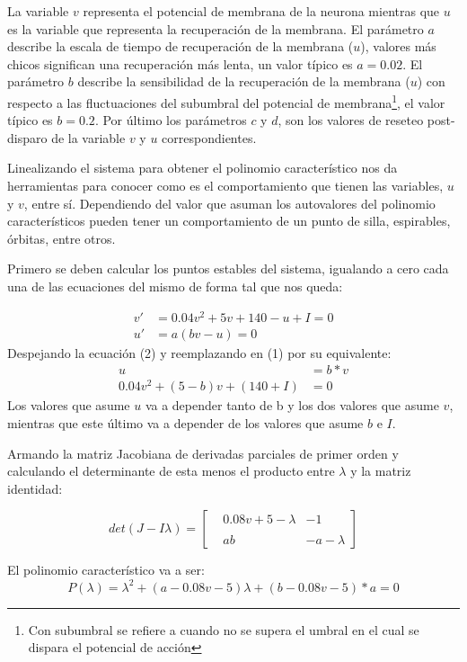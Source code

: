\documentclass[12pt,a4paper]{article}
\begin{document}
La variable $v$ representa el potencial de membrana de la neurona mientras que $u$ es la variable que representa la recuperación de la membrana. El parámetro $a$ describe la escala de tiempo de recuperación de la membrana ($u$), valores más chicos significan una recuperación más lenta, un valor típico es $a=0.02$. El parámetro $b$ describe la sensibilidad de la recuperación de la membrana ($u$) con respecto a las fluctuaciones del subumbral del potencial de membrana\footnote{Con subumbral se refiere a cuando no se supera el umbral en el cual se dispara el potencial de acción}, el valor típico es $b=0.2$. Por último los parámetros $c$ y $d$, son los valores de reseteo post-disparo de la variable $v$ y $u$ correspondientes. 

Linealizando el sistema para obtener el polinomio característico nos da herramientas para conocer como es el comportamiento que tienen las variables, $u$ y $v$, entre sí. Dependiendo del valor que asuman los autovalores del polinomio característicos pueden tener un comportamiento de un punto de silla, espirables, órbitas, entre otros.

Primero se deben calcular los puntos estables del sistema, igualando a cero cada una de las ecuaciones del mismo de forma tal que nos queda:

\begin{align}
v' &= 0.04v^2 + 5v +140 -u + I = 0\\
u' &= a(bv-u) = 0
\end{align}
Despejando la ecuación (2) y reemplazando en (1) por su equivalente:
\begin{align*}
u &= b*v \\
0.04v^2 + (5-b)v + (140+I) &= 0
\end{align*}
Los valores que asume $u$ va a depender tanto de b y los dos valores que asume $v$, mientras que este último va a depender de los valores que asume $b$ e $I$. 

Armando la matriz Jacobiana de derivadas parciales de primer orden y calculando el determinante de esta menos el producto entre $\lambda$ y la matriz identidad:

$$det(J-I\lambda) =\begin{bmatrix}
&0.08v + 5- \lambda & -1 \\ \\
&ab & -a-\lambda
\end{bmatrix}$$

El polinomio característico va a ser: 
$$P(\lambda) = \lambda^2 +(a-0.08v-5)\lambda + (b-0.08v-5)*a = 0$$
\end{document}
